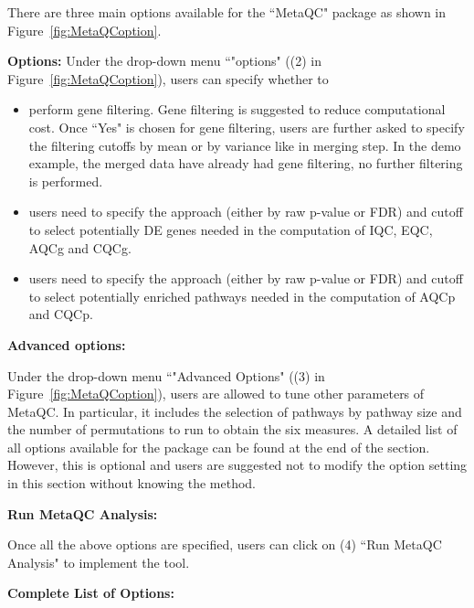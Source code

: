 There are three main options available for the ``MetaQC" package as shown in Figure~\ref{fig:MetaQCoption}. 

\begin{steps}
\item \textbf{Options:}
Under the drop-down menu ``"options" ({\color{red}(2)} in Figure~\ref{fig:MetaQCoption}),
users can specify whether to 

\begin{itemize}
\item perform gene filtering. Gene filtering is suggested to reduce computational cost. Once ``Yes" is chosen for gene filtering, users are further asked to specify the filtering cutoffs by mean or by variance like in merging step. In the demo example, the merged data have already had gene filtering, no further filtering is performed. 
\item users need to specify the approach (either by raw p-value or FDR) and cutoff to select potentially DE genes needed in the computation of IQC, EQC, AQCg and CQCg.
\item users need to specify the approach (either by raw p-value or FDR) and cutoff to select potentially enriched pathways needed in the computation of AQCp and CQCp.
\end{itemize}

\item \textbf{Advanced options:}

Under the drop-down menu ``"Advanced Options" ({\color{red}(3)} in Figure~\ref{fig:MetaQCoption}), users are allowed to tune other parameters of MetaQC.
In particular, it includes the selection of pathways by pathway size and the number of permutations to run to obtain the six measures. A detailed list of all options available for the package can be found at the end of the section. 
However, this is optional and users are suggested not to modify the option setting in this section without knowing the method. 

\item \textbf{Run MetaQC Analysis:}

Once all the above options are specified, users can click on {\color{red}(4)} ``Run MetaQC Analysis" to implement the tool. 

\end{steps}


\textbf{Complete List of Options:} 

